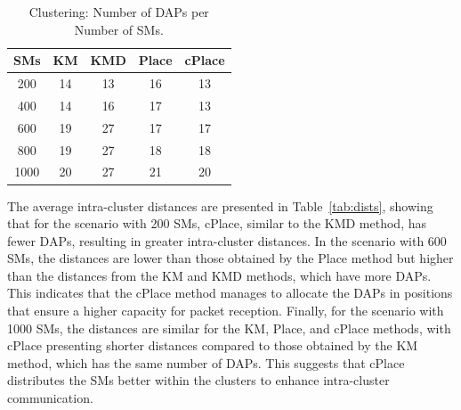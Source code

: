 \documentclass[a4paper,fleqn]{cas-dc}
\begin{document}
\begin{table}
    \centering
    \caption{Clustering: Number of DAPs per Number of \gls{SMs}.}
    \begin{tabular}{ccccc}
        \hline \hline
        \gls{SMs} &  KM & KMD & Place & cPlace \\ \hline
        200      &  14 &  13 &    16 &     13 \\
        400      &  14 &  16 &    17 &     13 \\
        600      &  19 &  27 &    17 &     17 \\ 
        800      &  19 &  27 &    18 &     18 \\ 
        1000     &  20 &  27 &    21 &     20 \\ \hline \hline
    \end{tabular}
    \label{tab:ndaps}
\end{table}

The average intra-cluster distances are presented in Table~\ref{tab:dists}, showing that for the scenario with 200 \gls{SMs}, cPlace, similar to the KMD method, has fewer \gls{DAPs}, resulting in greater intra-cluster distances. In the scenario with 600 \gls{SMs}, the distances are lower than those obtained by the Place method but higher than the distances from the KM and KMD methods, which have more \gls{DAPs}. This indicates that the cPlace method manages to allocate the \gls{DAPs} in positions that ensure a higher capacity for packet reception. Finally, for the scenario with 1000 \gls{SMs}, the distances are similar for the KM, Place, and cPlace methods, with cPlace presenting shorter distances compared to those obtained by the KM method, which has the same number of \gls{DAPs}. This suggests that cPlace distributes the \gls{SMs} better within the clusters to enhance intra-cluster communication.
\end{document}
